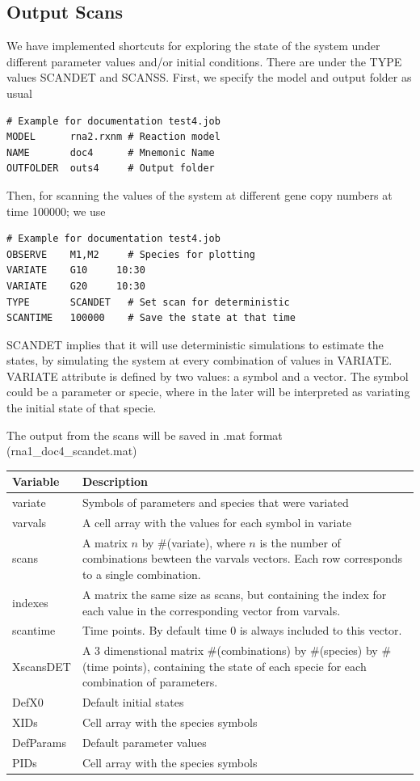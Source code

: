 \documentclass[letterpaper]{article}
\begin{document}
\subsection{Output Scans}

We have implemented shortcuts for exploring the state of the system
under different parameter values and/or initial conditions. There are
under the TYPE values SCANDET and SCANSS. First, we specify the model and
output folder as usual
{\footnotesize
\begin{verbatim}
# Example for documentation test4.job
MODEL      rna2.rxnm # Reaction model
NAME       doc4      # Mnemonic Name
OUTFOLDER  outs4     # Output folder
\end{verbatim}
}

Then, for scanning the values of the system at different gene copy
numbers at time 100000; we use
{\footnotesize
\begin{verbatim}
# Example for documentation test4.job
OBSERVE    M1,M2     # Species for plotting
VARIATE    G10     10:30
VARIATE    G20     10:30
TYPE       SCANDET   # Set scan for deterministic
SCANTIME   100000    # Save the state at that time
\end{verbatim}
}
SCANDET implies that it will use deterministic simulations to estimate
the states, by simulating the system at every combination of values in
VARIATE. VARIATE attribute is defined by two values: a symbol and a
vector. The symbol could be a parameter or specie, where in the later
will be interpreted as variating the initial state of that specie.

The output from the scans will be saved in \textsf{.mat} format
(\textsf{rna1\_doc4\_scandet.mat})\\
\begin{tabular}{|p{1.5cm}|p{9cm}|} 
  \hline
  Variable & Description \\
  \hline
  variate & Symbols of parameters and species that were variated \\
  varvals & A cell array with the values for each symbol in variate \\
  scans & A matrix $n$ by \#(variate), where $n$ is the number of
  combinations bewteen the varvals vectors. Each row corresponds to a
  single combination. \\
  indexes & A matrix the same size as scans, but containing the index
  for each value in the corresponding vector from varvals.\\
  scantime & Time points. By default time 0 is always included to this
  vector. \\
  XscansDET & A 3 dimenstional matrix \#(combinations) by \#(species)
  by \#(time points), containing the state of each specie for each
  combination of parameters. \\
  DefX0 & Default initial states \\
  XIDs & Cell array with the species symbols \\
  DefParams & Default parameter values \\
  PIDs & Cell array with the species symbols \\
  \hline
\end{tabular}\\ 
\end{document}
